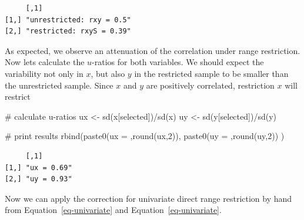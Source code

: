 \documentclass[
  letterpaper,
  DIV=11,
  numbers=noendperiod]{scrreprt}
\newenvironment{Shaded}{\begin{snugshade}}{\end{snugshade}}
\newcommand{\CommentTok}[1]{\textcolor[rgb]{0.37,0.37,0.37}{#1}}
\newcommand{\DecValTok}[1]{\textcolor[rgb]{0.68,0.00,0.00}{#1}}
\newcommand{\FunctionTok}[1]{\textcolor[rgb]{0.28,0.35,0.67}{#1}}
\newcommand{\NormalTok}[1]{\textcolor[rgb]{0.00,0.23,0.31}{#1}}
\newcommand{\OtherTok}[1]{\textcolor[rgb]{0.00,0.23,0.31}{#1}}
\newcommand{\SpecialCharTok}[1]{\textcolor[rgb]{0.37,0.37,0.37}{#1}}
\newcommand{\StringTok}[1]{\textcolor[rgb]{0.13,0.47,0.30}{#1}}
\begin{document}
\begin{verbatim}
     [,1]                     
[1,] "unrestricted: rxy = 0.5"
[2,] "restricted: rxyS = 0.39"
\end{verbatim}

As expected, we observe an attenuation of the correlation under range
restriction. Now lets calculate the \(u\)-ratios for both variables. We
should expect the variability not only in \(x\), but also \(y\) in the
restricted sample to be smaller than the unrestricted sample. Since
\(x\) and \(y\) are positively correlated, restriction \(x\) will
restrict

\begin{Shaded}
\begin{Highlighting}[]
\CommentTok{\# calculate u{-}ratios}
\NormalTok{ux }\OtherTok{\textless{}{-}} \FunctionTok{sd}\NormalTok{(x[selected])}\SpecialCharTok{/}\FunctionTok{sd}\NormalTok{(x)}
\NormalTok{uy }\OtherTok{\textless{}{-}} \FunctionTok{sd}\NormalTok{(y[selected])}\SpecialCharTok{/}\FunctionTok{sd}\NormalTok{(y)}

\CommentTok{\# print results}
\FunctionTok{rbind}\NormalTok{(}\FunctionTok{paste0}\NormalTok{(}\StringTok{\textquotesingle{}ux = \textquotesingle{}}\NormalTok{,}\FunctionTok{round}\NormalTok{(ux,}\DecValTok{2}\NormalTok{)),}
      \FunctionTok{paste0}\NormalTok{(}\StringTok{\textquotesingle{}uy = \textquotesingle{}}\NormalTok{,}\FunctionTok{round}\NormalTok{(uy,}\DecValTok{2}\NormalTok{))}
\NormalTok{      )}
\end{Highlighting}
\end{Shaded}

\begin{verbatim}
     [,1]       
[1,] "ux = 0.69"
[2,] "uy = 0.93"
\end{verbatim}

Now we can apply the correction for univariate direct range restriction
by hand from Equation~\ref{eq-univariate} and
Equation~\ref{eq-univariate}.
\end{document}
